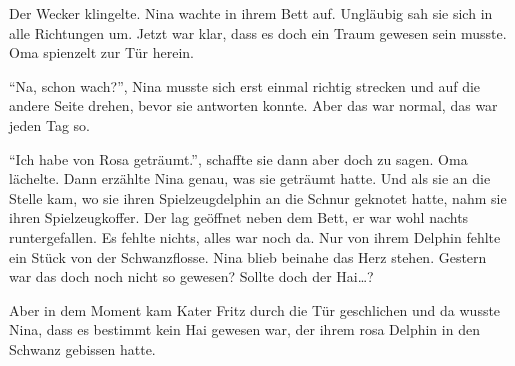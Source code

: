 \medskip
\begin{mdframed}[style=mystyle]
Der Wecker klingelte. Nina wachte in ihrem Bett auf. Ungläubig sah sie sich in alle Richtungen um. Jetzt war klar, dass es doch ein Traum gewesen sein musste. Oma spienzelt zur Tür herein.

\enquote{Na, schon wach?}, Nina musste sich erst einmal richtig strecken und auf die andere Seite drehen, bevor sie antworten konnte. Aber das war normal, das war jeden Tag so.

\enquote{Ich habe von Rosa geträumt.}, schaffte sie dann aber doch zu sagen. Oma lächelte. Dann erzählte Nina genau, was sie geträumt hatte. Und als sie an die Stelle kam, wo sie ihren Spielzeugdelphin an die Schnur geknotet hatte, nahm sie ihren Spielzeugkoffer. Der lag geöffnet neben dem Bett, er war wohl nachts runtergefallen. Es fehlte nichts, alles war noch da. Nur von ihrem Delphin fehlte ein Stück von der Schwanzflosse. Nina blieb beinahe das Herz stehen. Gestern war das doch noch nicht so gewesen? Sollte doch der Hai\dots?

Aber in dem Moment kam Kater Fritz durch die Tür geschlichen und da wusste Nina, dass es bestimmt kein Hai gewesen war, der ihrem rosa Delphin in den Schwanz gebissen hatte. 
\end{mdframed}\medskip
\vspace{3cm}
\begin{center}
	\Huge\color{red}\FourClowerOpen
\end{center}
